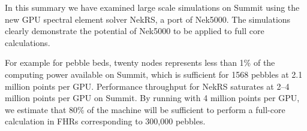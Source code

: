 \documentclass{anstrans}
\begin{document}
In this summary we have examined large scale simulations on Summit using the new GPU spectral element solver NekRS, a port of Nek5000. The simulations clearly demonstrate the potential of Nek5000 to be applied to full core calculations.

For example for pebble beds, twenty nodes represents less than 1\% of the computing power available on
Summit, which is sufficient for 1568 pebbles at 2.1 million points per
GPU.  Performance throughput for NekRS saturates at 2--4 million points
per GPU on Summit.  By running with 4 million points per GPU, we estimate that
80\% of the machine will be sufficient to perform a full-core calculation in
FHRs corresponding to 300,000 pebbles.



\end{document}
